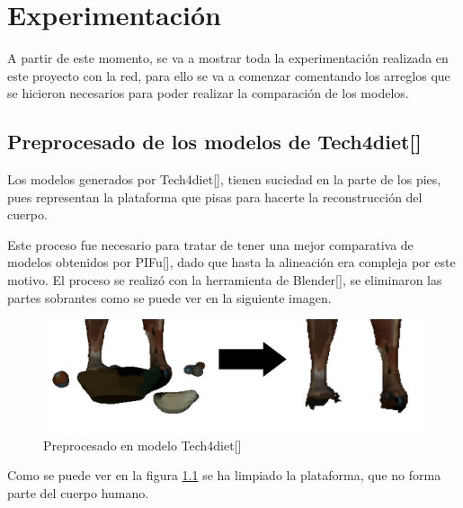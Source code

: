 
\chapter{Experimentación}
\label{experimentacion}

A partir de este momento, se va a mostrar toda la experimentación realizada en este proyecto con la red, para ello se va a comenzar comentando los arreglos que se hicieron necesarios para poder realizar la comparación de los modelos.

\section{Preprocesado de los modelos de Tech4diet[\cite{tech}]}

Los modelos generados por Tech4diet[\cite{tech}], tienen suciedad en la parte de los pies, pues representan la plataforma que pisas para hacerte la reconstrucción del cuerpo.

Este proceso fue necesario para tratar de tener una mejor comparativa de modelos obtenidos por PIFu[\cite{pifu}], dado que hasta la alineación era compleja por este motivo. El proceso se realizó con la herramienta de Blender[\cite{blender}], se eliminaron las partes sobrantes como se puede ver en la siguiente imagen.

\begin{figure}[H]
	\centering
	\includegraphics[scale=0.8]{imagenes/experimentacion1.png}
	\caption{Preprocesado en modelo Tech4diet[\cite{tech}]}
	\label{fig:figura9}
\end{figure}

Como se puede ver en la figura \ref{fig:figura9} se ha limpiado la plataforma, que no forma parte del cuerpo humano.

